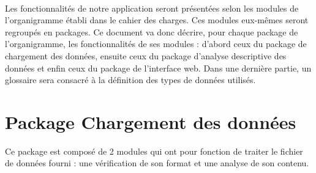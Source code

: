 		\paragraph{}Les fonctionnalités de notre application seront présentées selon les modules de l'organigramme établi dans le cahier des charges. Ces modules eux-mêmes seront regroupés en packages. Ce document va donc décrire, pour chaque package de l'organigramme, les fonctionnalités de ses modules : d'abord ceux du package de chargement des données, ensuite ceux du package d'analyse descriptive des données et enfin ceux du package de l'interface web. Dans une dernière partie, un glossaire sera consacré à la définition des types de données utilisés.
		
	\section{Package Chargement des données}
	Ce package est composé de 2 modules qui ont pour fonction de traiter le fichier de données fourni : une vérification de son format et une analyse de son contenu.
		
